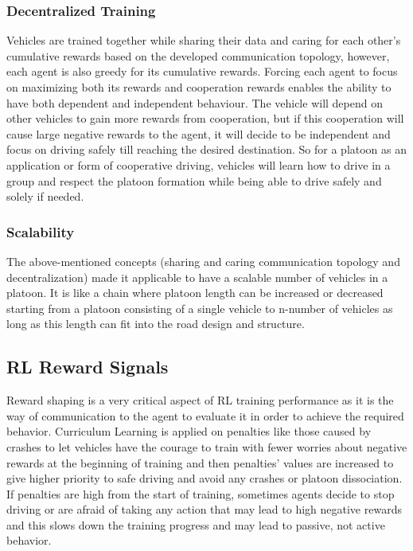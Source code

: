 \subsubsection{Decentralized Training}
Vehicles are trained together while sharing their data and caring for each other's cumulative rewards based on the developed communication topology, however, each agent is also greedy for its cumulative rewards.
Forcing each agent to focus on maximizing both its rewards and cooperation rewards enables the ability to have both dependent and independent behaviour. The vehicle will depend on other vehicles to gain more rewards from cooperation, but if this cooperation will cause large negative rewards to the agent, it will decide to be independent and focus on driving safely till reaching the desired destination. So for a platoon as an application or form of cooperative driving, vehicles will learn how to drive in a group and respect the platoon formation while being able to drive safely and solely if needed.


\subsubsection{Scalability}
The above-mentioned concepts (sharing and caring communication topology and decentralization) made it applicable to have a scalable number of vehicles in a platoon. It is like a chain where platoon length can be increased or decreased starting from a platoon consisting of a single vehicle to n-number of vehicles as long as this length can fit into the road design and structure.


\subsection{RL Reward Signals}
Reward shaping is a very critical aspect of RL training performance as it is the way of communication to the agent to evaluate it in order to achieve the required behavior.
Curriculum Learning\cite{bengio2009curriculum} is applied on penalties like those caused by crashes to let vehicles have the courage to train with fewer worries about negative rewards at the beginning of training and then penalties' values are increased to give higher priority to safe driving and avoid any crashes or platoon dissociation. If penalties are high from the start of training, sometimes agents decide to stop driving or are afraid of taking any action that may lead to high negative rewards and this slows down the training progress and may lead to passive, not active behavior.

